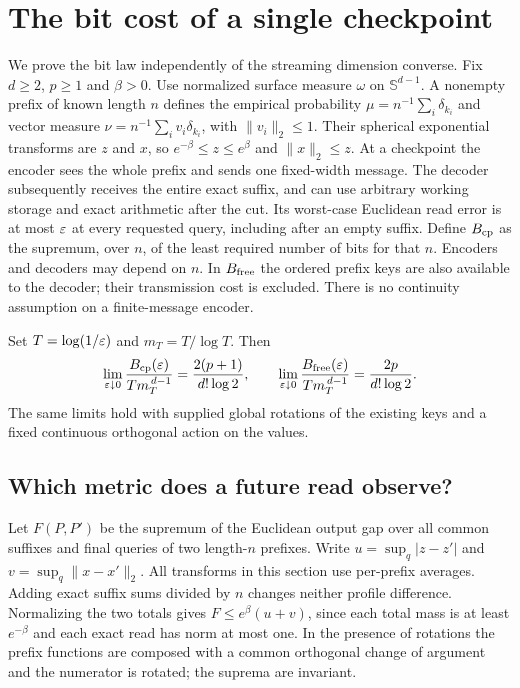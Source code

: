 \section{The bit cost of a single checkpoint}\label{app:entropy}
We prove the bit law independently of the streaming dimension converse. Fix $d\ge2$, $p\ge1$ and $\beta>0$. Use normalized surface measure $\omega$ on $\mathbb S^{d-1}$. A nonempty prefix of known length $n$ defines the empirical probability $\mu=n^{-1}\sum_i\delta_{k_i}$ and vector measure $\nu=n^{-1}\sum_i v_i\delta_{k_i}$, with $\|v_i\|_2\le1$. Their spherical exponential transforms are $z$ and $x$, so $e^{-\beta}\le z\le e^\beta$ and $\|x\|_2\le z$. At a checkpoint the encoder sees the whole prefix and sends one fixed-width message. The decoder subsequently receives the entire exact suffix, and can use arbitrary working storage and exact arithmetic after the cut. Its worst-case Euclidean read error is at most $\varepsilon$ at every requested query, including after an empty suffix. Define $B_{\mathrm{cp}}$ as the supremum, over $n$, of the least required number of bits for that $n$. Encoders and decoders may depend on $n$. In $B_{\mathrm{free}}$ the ordered prefix keys are also available to the decoder; their transmission cost is excluded. There is no continuity assumption on a finite-message encoder.

\begin{theorem}\label{th:bits}
Set $T=\log(1/\varepsilon)$ and $m_T=T/\log T$. Then
\[
 \lim_{\varepsilon\downarrow0}\frac{B_{\mathrm{cp}}(\varepsilon)}{T m_T^{\,d-1}}
 =\frac{2(p+1)}{d!\log2},
 \qquad
 \lim_{\varepsilon\downarrow0}\frac{B_{\mathrm{free}}(\varepsilon)}{T m_T^{\,d-1}}
 =\frac{2p}{d!\log2}.
\]
The same limits hold with supplied global rotations of the existing keys and a fixed continuous orthogonal action on the values.
\end{theorem}

\subsection{Which metric does a future read observe?}
Let $F(P,P')$ be the supremum of the Euclidean output gap over all common suffixes and final queries of two length-$n$ prefixes. Write $u=\sup_q|z-z'|$ and $v=\sup_q\|x-x'\|_2$. All transforms in this section use per-prefix averages. Adding exact suffix sums divided by $n$ changes neither profile difference. Normalizing the two totals gives $F\le e^\beta(u+v)$, since each total mass is at least $e^{-\beta}$ and each exact read has norm at most one. In the presence of rotations the prefix functions are composed with a common orthogonal change of argument and the numerator is rotated; the suprema are invariant.

